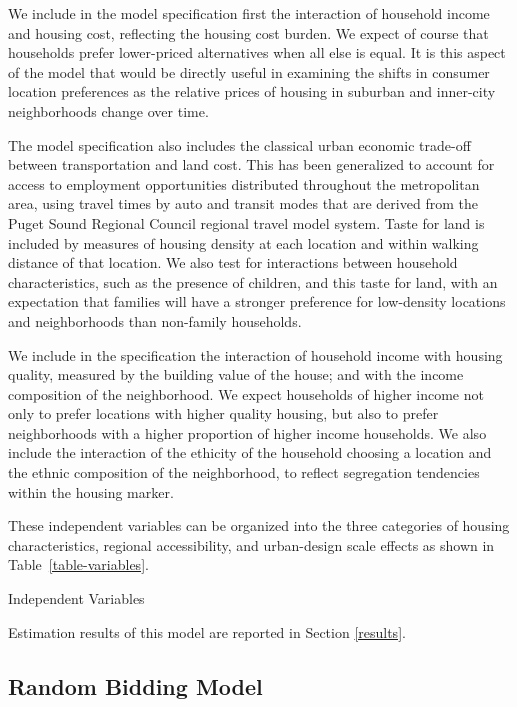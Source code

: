 \documentclass{article}
\begin{document}
We include in the model specification first the interaction of household income and housing cost,
reflecting the housing cost burden.  We expect of course that households prefer lower-priced
alternatives when all else is equal.  It is this aspect of the model that would be directly useful
in examining the shifts in consumer location preferences as the relative prices of housing in
suburban and inner-city neighborhoods change over time.

The model specification also includes the classical urban economic trade-off between
transportation and land cost. This has been generalized to account
for access to employment opportunities distributed throughout the metropolitan
area, using travel times by auto and transit modes that are derived from the
Puget Sound Regional Council regional travel model system.  Taste for land is included by
measures of housing density at each location and within walking distance of that location.  We also
test for interactions between household characteristics, such as the presence of children, and this
taste for land, with an expectation that families will have a stronger preference for low-density
locations and neighborhoods than non-family households.

We include in the specification the interaction of household income with housing quality,
measured by the building value of the house; and with the income composition of the neighborhood.  We
expect households of higher income not only to prefer locations with higher quality housing, but also
to prefer neighborhoods with a higher proportion of higher income households. We also include the
interaction of the ethicity of the household choosing a location and the ethnic composition of the
neighborhood, to reflect segregation tendencies within the housing marker.

These independent variables can be organized into the three
categories of housing characteristics, regional accessibility, and
urban-design scale effects as shown in Table~\ref{table-variables}.

\begin{table}
\begin{center}
\caption{Independent Variables} \label{table-variables}

\end{center}
\end{table}

Estimation results of this model are reported in Section \ref{results}.


\subsection{Random Bidding Model}
\end{document}
